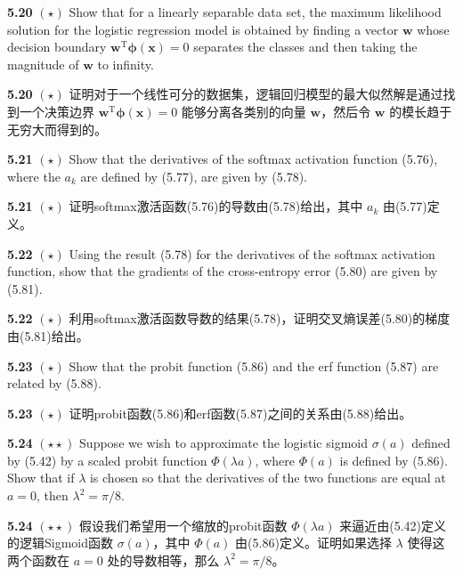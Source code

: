 \documentclass{article}
\begin{document}
\textbf{5.20} $(\star)$ Show that for a linearly separable data set, the maximum likelihood solution for the logistic regression model is obtained by finding a vector $\mathbf{w}$ whose decision boundary $\mathbf{w}^{\mathrm{T}}\boldsymbol{\phi}(\mathbf{x}) = 0$ separates the classes and then taking the magnitude of $\mathbf{w}$ to infinity.

\textbf{5.20} $(\star)$ 证明对于一个线性可分的数据集，逻辑回归模型的最大似然解是通过找到一个决策边界 $\mathbf{w}^{\mathrm{T}}\boldsymbol{\phi}(\mathbf{x}) = 0$ 能够分离各类别的向量 $\mathbf{w}$，然后令 $\mathbf{w}$ 的模长趋于无穷大而得到的。


\textbf{5.21} $(\star)$ Show that the derivatives of the softmax activation function (5.76), where the $a_k$ are defined by (5.77), are given by (5.78).

\textbf{5.21} $(\star)$ 证明softmax激活函数(5.76)的导数由(5.78)给出，其中 $a_k$ 由(5.77)定义。


\textbf{5.22} $(\star)$ Using the result (5.78) for the derivatives of the softmax activation function, show that the gradients of the cross-entropy error (5.80) are given by (5.81).

\textbf{5.22} $(\star)$ 利用softmax激活函数导数的结果(5.78)，证明交叉熵误差(5.80)的梯度由(5.81)给出。


\textbf{5.23} $(\star)$ Show that the probit function (5.86) and the erf function (5.87) are related by (5.88).

\textbf{5.23} $(\star)$ 证明probit函数(5.86)和erf函数(5.87)之间的关系由(5.88)给出。


\textbf{5.24} $(\star\star)$ Suppose we wish to approximate the logistic sigmoid $\sigma(a)$ defined by (5.42) by a scaled probit function $\Phi(\lambda a)$, where $\Phi(a)$ is defined by (5.86). Show that if $\lambda$ is chosen so that the derivatives of the two functions are equal at $a = 0$, then $\lambda^2 = \pi/8$.

\textbf{5.24} $(\star\star)$ 假设我们希望用一个缩放的probit函数 $\Phi(\lambda a)$ 来逼近由(5.42)定义的逻辑Sigmoid函数 $\sigma(a)$，其中 $\Phi(a)$ 由(5.86)定义。证明如果选择 $\lambda$ 使得这两个函数在 $a = 0$ 处的导数相等，那么 $\lambda^2 = \pi/8$。
\end{document}
